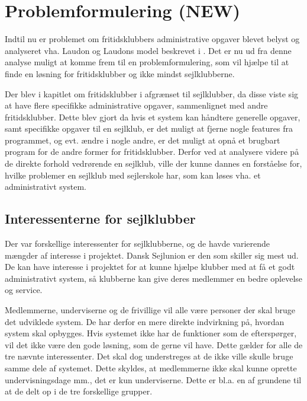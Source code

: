 \chapter{Problemformulering (NEW)}\label{chap:problemformulering-new}

Indtil nu er problemet om fritidsklubbers administrative opgaver blevet belyst og analyseret vha. Laudon og
Laudons model beskrevet i . Det er nu ud fra denne analyse muligt at
komme frem til en problemformulering, som vil hjælpe til at finde en løsning for fritidsklubber og ikke mindst
sejlklubberne.

Der blev i kapitlet om fritidsklubber i  afgrænset til sejlklubber, da disse viste sig
at have flere specifikke administrative opgaver, sammenlignet med andre fritidsklubber. Dette blev gjort da
hvis et system kan håndtere generelle opgaver, samt specifikke opgaver til en sejlklub, er det muligt at
fjerne nogle features fra programmet, og evt. ændre i nogle andre, er det muligt at opnå et brugbart program
for de andre former for fritidsklubber.  Derfor ved at analysere videre på de
direkte forhold vedrørende en sejlklub, ville der kunne dannes en forståelse for, hvilke problemer en sejlklub
med sejlerskole har, som kan løses vha. et administrativt system.


\section{Interessenterne for sejlklubber}

Der var forskellige interessenter for sejlklubberne, og de havde varierende mængder af interesse i projektet.
Dansk Sejlunion er den som skiller sig mest ud. De kan have interesse i projektet for at kunne hjælpe klubber
med at få et godt administrativt system, så klubberne kan give deres medlemmer en bedre oplevelse og service.

Medlemmerne, underviserne og de frivillige vil alle være personer der skal bruge det udviklede system. De har
derfor en mere direkte indvirkning på, hvordan system skal opbygges. Hvis systemet ikke har de funktioner som
de efterspørger, vil det ikke være den gode løsning, som de gerne vil have. Dette gælder for alle de tre
nævnte interessenter. Det skal dog understreges at de ikke ville skulle bruge samme dele af systemet. Dette
skyldes, at medlemmerne ikke skal kunne oprette undervisningsdage mm., det er kun underviserne. Dette er bl.a.
en af grundene til at de delt op i de tre forskellige grupper.


